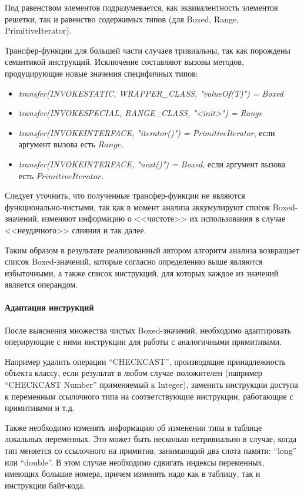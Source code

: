 Под равенством элементов подразумевается, как эквивалентность элементов решетки, так и равенство
содержимых типов (для Boxed, Range, PrimitiveIterator).

Трансфер-функции для большей части случаев тривиальны, так как порождены семантикой инструкций.
Исключение составляют вызовы методов, продуцирующие новые значения специфичных типов:
\begin{itemize}
    \item \textit{transfer(INVOKESTATIC, WRAPPER\_CLASS, "valueOf(T)") = Boxed}
    \item \textit{transfer(INVOKESPECIAL, RANGE\_CLASS, "<init>") = Range}
    \item \textit{transfer(INVOKEINTERFACE, "iterator()") = PrimitiveIterator}, если аргумент вызова есть $Range$.
    \item \textit{transfer(INVOKEINTERFACE, "next()") = Boxed}, если аргумент вызова есть $PrimitiveIterator$.
\end{itemize}

Следует уточнить, что полученные трансфер-функции не являются функционально-чистыми, так как
в момент анализа аккумулируют список Boxed-значений, изменяют информацию о <<чистоте>> их
использования в случае <<неудачного>> слияния и так далее.

Таким образом в результате реализованный автором алгоритм анализа возвращает список Boxed-значений,
которые согласно определению выше являются избыточными, а также список инструкций, для
которых каждое из значений является операндом.

\paragraph{Адаптация инструкций}
После выяснения множества чистых Boxed-значений, необходимо адаптировать оперирующие
с ними инструкции для работы с аналогичными примитивами.

Например удалить операции ``CHECKCAST'', производящие принадлежность объекта классу, если результат
в любом случае положителен (например ``CHECKCAST Number'' применяемый к Integer), заменить
инструкции доступа к переменным ссылочного типа на соответствующие инструкции, работающие
с примитивами и т.д.

Также необходимо изменять информацию об изменении типа в таблице локальных переменных.
Это может быть несколько нетривиально в случае, когда тип меняется со ссылочного на примитив,
занимающий два слота памяти: ``long'' или ``double''.
В этом случае необходимо сдвигать индексы переменных, имеющих большие номера, причем изменять надо
как в таблицу, так и инструкции байт-кода.

